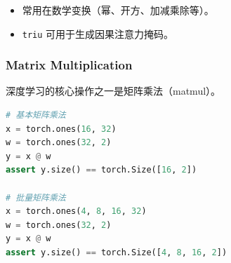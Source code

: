 
\begin{itemize}[leftmargin=1.5em]
    \item 常用在数学变换（幂、开方、加减乘除等）。
    \item \verb|triu| 可用于生成因果注意力掩码。
\end{itemize}


\subsubsection{Matrix Multiplication}

深度学习的核心操作之一是矩阵乘法（matmul）。

\begin{lstlisting}[language=Python]
# 基本矩阵乘法
x = torch.ones(16, 32)
w = torch.ones(32, 2)
y = x @ w
assert y.size() == torch.Size([16, 2])

# 批量矩阵乘法
x = torch.ones(4, 8, 16, 32)
w = torch.ones(32, 2)
y = x @ w
assert y.size() == torch.Size([4, 8, 16, 2])
\end{lstlisting}

